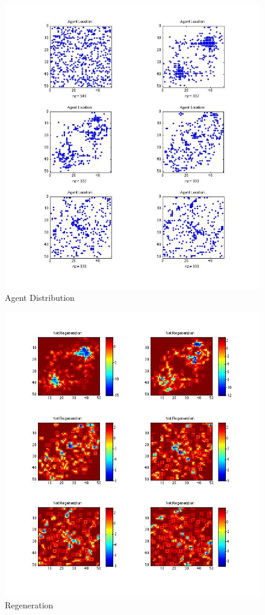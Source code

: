 \documentclass{article}
\begin{document}
\begin{figure}[ht]
	\begin{center}
		\includegraphics[scale=.75]{agents.jpg}
		\caption{Agent Distribution}
	\end{center}
\end{figure} 

\begin{figure}[ht]
	\begin{center}
		\includegraphics[scale=.75]{regen.jpg}
		\caption{Regeneration}
	\end{center}
\end{figure} 
\end{document}
